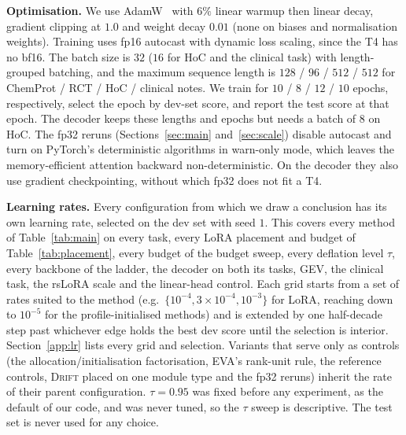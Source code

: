 \documentclass[conference,onecolumn]{IEEEtran}
\newcommand{\method}{\textsc{Drift}}
\begin{document}
\noindent\textbf{Optimisation.} We use AdamW~\cite{loshchilov2019adamw} with
$6\%$ linear warmup then linear decay, gradient clipping at $1.0$ and weight
decay $0.01$ (none on biases and normalisation weights). Training uses fp16
autocast with dynamic loss scaling, since the T4 has no bf16. The batch size is
$32$ ($16$ for HoC and the clinical task) with length-grouped batching, and the
maximum sequence length is $128$ / $96$ / $512$ / $512$ for ChemProt / RCT / HoC
/ clinical notes. We train for $10$ / $8$ / $12$ / $10$ epochs, respectively,
select the epoch by dev-set score, and report the test score at that epoch. The
decoder keeps these lengths and epochs but needs a batch of $8$ on HoC. The
fp32 reruns (Sections~\ref{sec:main} and~\ref{sec:scale}) disable autocast and
turn on PyTorch's deterministic algorithms in warn-only mode, which leaves the
memory-efficient attention backward non-deterministic. On the decoder they also
use gradient checkpointing, without which fp32 does not fit a T4.

\noindent\textbf{Learning rates.}
Every configuration from which we draw a conclusion has its own learning rate,
selected on the dev set with seed $1$. This covers every method of
Table~\ref{tab:main} on every task, every LoRA placement and budget of
Table~\ref{tab:placement}, every budget of the budget sweep, every deflation
level $\tau$, every backbone of the ladder, the decoder on both its tasks, GEV,
the clinical task, the rsLoRA scale and the linear-head control. Each grid
starts from a set of rates suited to the method (e.g.\ $\{10^{-4},
3\times10^{-4}, 10^{-3}\}$ for LoRA, reaching down to $10^{-5}$ for the
profile-initialised methods) and is extended by one half-decade step past
whichever edge holds the best dev score until the selection is interior.
Section~\ref{app:lr} lists every grid and selection. Variants that serve only
as controls (the allocation/initialisation factorisation, EVA's rank-unit rule,
the reference controls, \method{} placed on one module type and the fp32 reruns)
inherit the rate of their parent configuration. $\tau = 0.95$ was fixed before any experiment, as the default of
our code, and was never tuned, so the $\tau$ sweep is descriptive. The test set
is never used for any choice.
\end{document}
